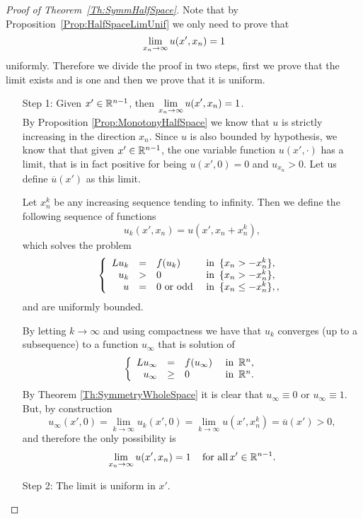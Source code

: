 \begin{proof}[Proof of Theorem~\ref{Th:SymmHalfSpace}]
Note that by Proposition~\ref{Prop:HalfSpaceLimUnif} we only need to prove that 
$$
\displaystyle \lim_{x_n\to \infty} u(x',x_n) = 1
$$
uniformly. Therefore we divide the proof in two steps, first we prove that the limit exists and is one and then we prove that it is uniform.
\begin{enumerate}
\item[Step 1:] Given $x'\in \mathbb{R}^{n-1}$, then  $\displaystyle \lim_{x_n\to \infty} u(x',x_n) = 1$.\\

By Proposition \ref{Prop:MonotonyHalfSpace} we know that $u$ is strictly increasing in the direction $x_n$. Since $u$ is also bounded by hypothesis, we know that that given $x'\in\mathbb{R}^{n-1}$, the one variable function $u(x',\cdot)$ has a limit, that is in fact positive for being $u(x',0) = 0$ and $u_{x_n}>0$. Let us define $\overline{u}(x')$ as this limit.

Let $x_n^k$ be any increasing sequence tending to infinity. Then we define the following sequence of functions
$$ u_k(x',x_n) = u(x',x_n+x_n^k), $$
which solves the problem
\begin{equation}
\left\{\begin{array}{rcll}
Lu_k &=& f(u_k)   &\textrm{ in } \,\{x_n>-x_n^k\},\\
u_k &>& 0   &\textrm{ in } \,\{x_n>-x_n^k\},\\
u &=& 0 \,\, \text{or odd}  &\textrm{ in } \,\{x_n\leq-x_n^k\},,
\end{array} \right.
\end{equation}
and are uniformly bounded.

By letting $k\to\infty$ and using compactness \todo{!!!!} we have that $u_k$ converges (up to a subsequence) to a function $u_\infty$ that is solution of
\begin{equation}
\left\{\begin{array}{rcll}
Lu_\infty &=& f(u_\infty)   &\textrm{ in } \,\mathbb{R}^n,\\
u_\infty &\geq& 0   &\textrm{ in } \,\mathbb{R}^n.
\end{array} \right.
\end{equation}
By Theorem \ref{Th:SymmetryWholeSpace} it is clear that $u_\infty\equiv 0$ or $u_\infty \equiv 1$. But, by construction
$$ u_\infty(x',0) = \lim_{k\to \infty} u_k(x',0) = \lim_{k\to \infty} u(x',x_n^k) = \overline{u}(x') > 0, $$
and therefore the only possibility is
$$ \lim_{x_n\to \infty} u(x',x_n) = 1 \,\,\,\,\, \text{ for all} \, x'\in\mathbb{R}^{n-1}. $$

\item[Step 2:] The limit is uniform in $x'$.


\end{enumerate}
\end{proof}
